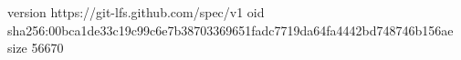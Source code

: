 version https://git-lfs.github.com/spec/v1
oid sha256:00bca1de33c19c99c6e7b38703369651fadc7719da64fa4442bd748746b156ae
size 56670
